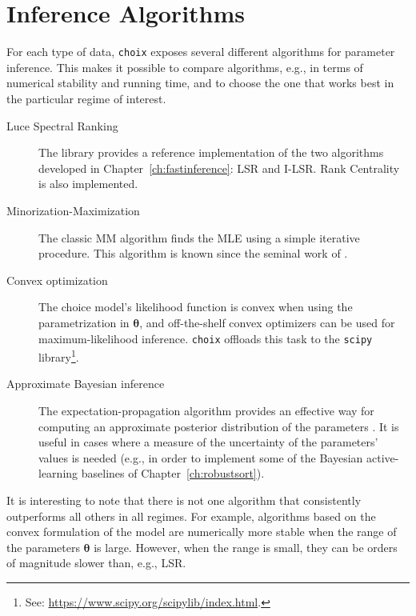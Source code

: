 \section{Inference Algorithms}

For each type of data, \texttt{choix} exposes several different algorithms for parameter inference.
This makes it possible to compare algorithms, e.g., in terms of numerical stability and running time, and to choose the one that works best in the particular regime of interest.

\begin{description}
\item[Luce Spectral Ranking] The library provides a reference implementation of the two algorithms developed in Chapter~\ref{ch:fastinference}: LSR and I-LSR.
Rank Centrality \citep{negahban2012iterative} is also implemented.

\item[Minorization-Maximization] The classic MM algorithm finds the MLE using a simple iterative procedure.
This algorithm is known since the seminal work of \citet{zermelo1928berechnung}.

\item[Convex optimization] The choice model's likelihood function is convex when using the parametrization in $\bm{\theta}$, and off-the-shelf convex optimizers can be used for maximum-likelihood inference.
\texttt{choix} offloads this task to the \texttt{scipy} library\footnote{%
See: \url{https://www.scipy.org/scipylib/index.html}.
}.

\item[Approximate Bayesian inference] The expectation-propagation algorithm provides an effective way for computing an approximate posterior distribution of the parameters \citep{minka2001family, chu2005gaussian}.
It is useful in cases where a measure of the uncertainty of the parameters' values is needed (e.g., in order to implement some of the Bayesian active-learning baselines of Chapter~\ref{ch:robustsort}).
\end{description}

It is interesting to note that there is not one algorithm that consistently outperforms all others in all regimes.
For example, algorithms based on the convex formulation of the model are numerically more stable when the range of the parameters $\bm{\theta}$ is large.
However, when the range is small, they can be orders of magnitude slower than, e.g., LSR.
